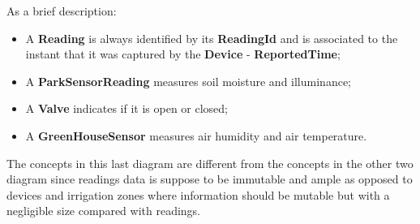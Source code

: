 As a brief description:

\begin{itemize}
   \item A \textbf{Reading} is always identified by its \textbf{ReadingId} and is associated to the instant that it was captured by the \textbf{Device} - \textbf{ReportedTime};
   \item A \textbf{ParkSensorReading} measures soil moisture and illuminance;
   \item A \textbf{Valve} indicates if it is open or closed;
   \item A \textbf{GreenHouseSensor} measures air humidity and air temperature.
\end{itemize}

The concepts in this last diagram are different from the concepts in the other two diagram since readings data is suppose to be immutable and ample as opposed to devices and irrigation zones where information should be mutable but with a negligible size compared with readings.
